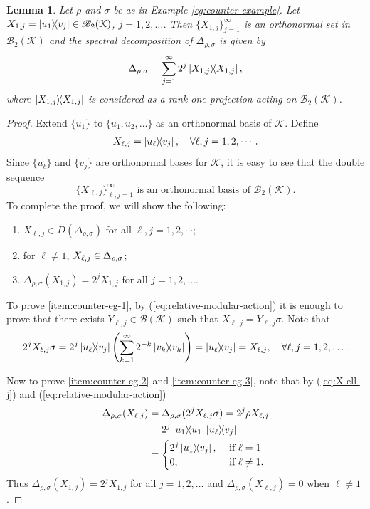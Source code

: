 \documentclass[12pt,a4paper,oneside]{article}
\numberwithin{equation}{section}
\theoremstyle{definition}  %
\theoremstyle{plain}  %
\newtheorem{lem}[defn]{Lemma}
\theoremstyle{remark} %
\newcommand{\B}[1]{\mathscr{B}({#1})}
\newcommand{\Bt}[1]{\mathscr{B}_2({#1})}
\newcommand{\CK}{\mathcal{K}}
\let\ker\relax
\DeclareMathOperator{\ker}{Ker}
\begin{document}
 
\begin{lem}\label{lem:relative-modular-spectral}
  Let $\rho$ and $\sigma$ be as in Example \ref{eg:counter-example}. Let $X_{1,j}=\ketbra{u_1}{v_j}\in \Bt{\CK }$, $j=1,2,\dots$. Then $\{X_{1,j}\}_{j=1}^{\infty}$ is an orthonormal set in $\Bt{\CK }$ and the spectral decomposition of $\Delta_{\rho,\sigma}$ is given by
  \begin{align}\label{eq:relative-modular-spectral}
   \Delta_{\rho,\sigma}= \sum_{j = 1}^{\infty} 2^j  \ketbra{X_{1,j}},
  \end{align}
  where $\ketbra{X_{1,j}}$ is  considered as a rank one projection acting on $\Bt{\CK }$. 
\end{lem}
 \begin{proof}
Extend $\{u_1\}$ to $\{u_1, u_2,\dots\}$ as an orthonormal basis of $\CK $. Define \begin{align}\label{eq:X-ell-j-defn}
    X_{\ell,j} = \ketbra{u_\ell}{v_j}, \quad \forall \ell, j = 1,2,\cdots.
\end{align}
Since $\{u_\ell\}$ and $\{v_j\}$ are orthonormal bases for $\CK $, it is easy to see that the double sequence \[\{X_{\ell,j}\}_{\ell, j=1}^{\infty} \text{ is an orthonormal basis of } \Bt{\CK }. \]
To complete the proof, we will show the following: \begin{enumerate}
    \item \label{item:counter-eg-1} $X_{\ell,j}\in D(\Delta_{\rho,\sigma})$ for all $\ell,j=1,2,\cdots$;
    \item \label{item:counter-eg-2} for $\ell\neq 1$, $X_{\ell,j}\in \ker \Delta_{\rho,\sigma}$;
    \item\label{item:counter-eg-3} $\Delta_{\rho,\sigma} (X_{1,j}) = 2^j X_{1,j}$ for all $j=1,2,\dots$.
\end{enumerate}


To prove \ref{item:counter-eg-1}, by (\ref{eq:relative-modular-action}) it is enough to prove that there exists $Y_{\ell,j}\in \B{\CK }$ such that $X_{\ell,j} = Y_{\ell,j}\sigma$. Note that \begin{align}\label{eq:X-ell-j}
    2^jX_{\ell,j}\sigma =2^j\ketbra{u_{\ell}}{v_j}\left(\sum_{k=1}^{\infty} 2^{-k}\ketbra{v_k}\right) =\ketbra{u_{\ell}}{v_j}= X_{\ell,j},\quad \forall \ell,j=1,2,\dots. 
\end{align}


Now to prove \ref{item:counter-eg-2} and \ref{item:counter-eg-3}, note that by  (\ref{eq:X-ell-j}) and (\ref{eq:relative-modular-action})
\begin{align*}
 \Delta_{\rho,\sigma} (X_{\ell,j})   &= \Delta_{\rho,\sigma} (2^jX_{\ell,j}\sigma)=2^j\rho X_{\ell,j}\\
 &=2^j\ketbra{u_1}\ketbra{u_{\ell}}{v_j}\\
 &=\begin{cases}
   2^j\ketbra{u_1}{v_j}, & \text{ if } \ell=1\\
   0, &\text{ if } \ell\neq 1.
 \end{cases}
\end{align*}
Thus $\Delta_{\rho,\sigma} (X_{1,j}) = 2^j X_{1,j}$ for all $j=1,2,\dots$ and $\Delta_{\rho,\sigma} (X_{\ell,j}) =0$ when $\ell\neq 1$.
 \end{proof}
\end{document}
